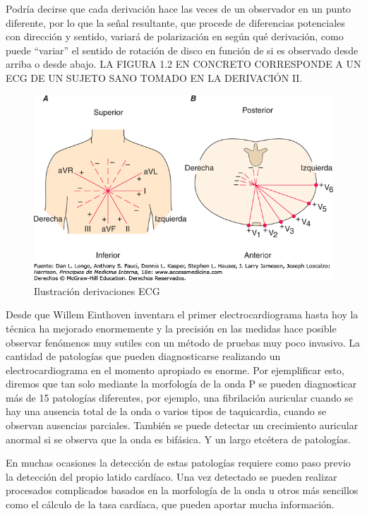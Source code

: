 Podría decirse que cada derivación hace las veces de un observador en un punto diferente, por lo que la señal resultante, que procede de diferencias potenciales con dirección y sentido, variará de polarización en según qué derivación, como puede “variar” el sentido de rotación de disco en función de si es observado desde arriba o desde abajo. LA FIGURA 1.2 EN CONCRETO CORRESPONDE A UN ECG DE UN SUJETO SANO TOMADO EN LA DERIVACIÓN II.

\begin{figure}[ht]
	\centering
		\includegraphics[width=0.9\linewidth]{figuras/derivations.png}
	\caption{Ilustración derivaciones ECG}
	\label{fig:derivaciones}
\end{figure} 

Desde que Willem Einthoven inventara el primer electrocardiograma hasta hoy la técnica ha mejorado enormemente y la precisión en las medidas hace posible observar fenómenos muy sutiles con un método de pruebas muy poco invasivo. La cantidad de patologías que pueden diagnosticarse realizando un electrocardiograma en el momento apropiado es enorme. \cite{PatologiasECG} Por ejemplificar esto, diremos que tan solo mediante la morfología de la onda P se pueden diagnosticar más de 15 patologías diferentes, por ejemplo, una fibrilación auricular cuando se hay una ausencia total de la onda o varios tipos de taquicardia, cuando se observan ausencias parciales. También se puede detectar un crecimiento auricular anormal si se observa que la onda es bifásica. Y un largo etcétera de patologías.

En muchas ocasiones la detección de estas patologías requiere como paso previo la detección del propio latido cardíaco. Una vez detectado se pueden realizar procesados complicados basados en la morfología de la onda u otros más sencillos como el cálculo de la tasa cardíaca, que pueden aportar mucha información.

